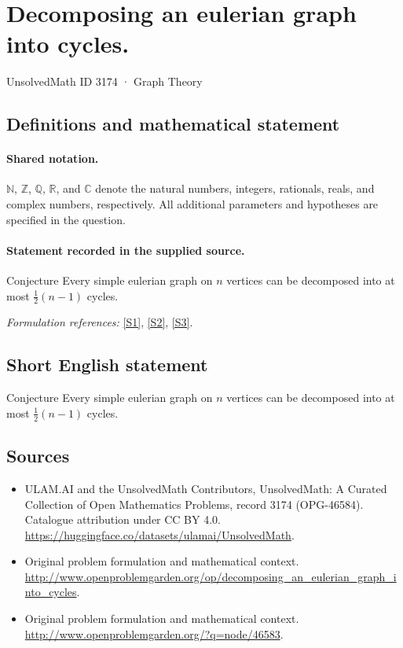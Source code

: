\documentclass[11pt]{article}
\newcommand{\sref}[2]{\hyperlink{source:#1:#2}{[S#2]}}
\begin{document}
\setcounter{section}{3173}
\section{Decomposing an eulerian graph into cycles.}\label{3174}
{\small UnsolvedMath ID 3174 · Graph Theory}
\subsection{Definitions and mathematical statement}

\paragraph{Shared notation.}$\mathbb N$, $\mathbb Z$, $\mathbb Q$, $\mathbb R$, and $\mathbb C$ denote the natural numbers, integers, rationals, reals, and complex numbers, respectively. All additional parameters and hypotheses are specified in the question.


\paragraph{Statement recorded in the supplied source.}
Conjecture Every simple eulerian graph on $n$ vertices can be decomposed into at most $\frac{1}{2}(n-1)$ cycles.
\par\smallskip\textit{Formulation references:} \sref{3174}{1}, \sref{3174}{2}, \sref{3174}{3}.
\subsection{Short English statement}
Conjecture Every simple eulerian graph on $n$ vertices can be decomposed into at most $\frac{1}{2}(n-1)$ cycles.
\subsection{Sources}
\begin{itemize}
\item[\hypertarget{source:3174:1}{S1}] ULAM.AI and the UnsolvedMath Contributors, UnsolvedMath: A Curated Collection of Open Mathematics Problems, record 3174 (OPG-46584). Catalogue attribution under CC BY 4.0.
\url{https://huggingface.co/datasets/ulamai/UnsolvedMath}.
\item[\hypertarget{source:3174:2}{S2}] Original problem formulation and mathematical context.
\url{http://www.openproblemgarden.org/op/decomposing_an_eulerian_graph_into_cycles}.
\item[\hypertarget{source:3174:3}{S3}] Original problem formulation and mathematical context.
\url{http://www.openproblemgarden.org/?q=node/46583}.
\end{itemize}
\label{end:3174}
\end{document}
